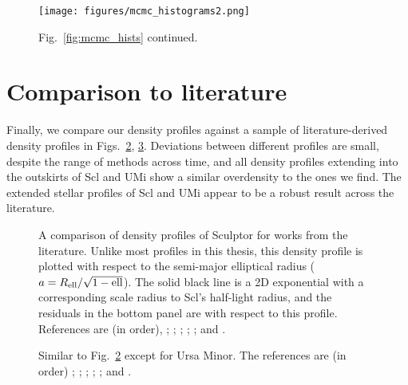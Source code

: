 \begin{figure}
\centering
\texttt{[image: figures/mcmc\_histograms2.png]}
\caption[Probabilistic density profiles
continued]{Fig.~\ref{fig:mcmc_hists} continued.}\label{fig:mcmc_hists2}
\end{figure}

\section{Comparison to literature}\label{comparison-to-literature}

Finally, we compare our density profiles against a sample of
literature-derived density profiles in
Figs.~\ref{fig:scl_lit_profiles}, \ref{fig:umi_lit_profiles}. Deviations
between different profiles are small, despite the range of methods
across time, and all density profiles extending into the outskirts of
Scl and UMi show a similar overdensity to the ones we find. The extended
stellar profiles of Scl and UMi appear to be a robust result across the
literature.

\begin{figure}
\centering
{}
\caption[Sculptor literature density profiles]{A comparison of density
profiles of Sculptor for works from the literature. Unlike most profiles
in this thesis, this density profile is plotted with respect to the
semi-major elliptical radius (\(a = R_{\rm ell} / \sqrt{1-{\rm ell}}\)).
The solid black line is a 2D exponential with a corresponding scale
radius to Scl's half-light radius, and the residuals in the bottom panel
are with respect to this profile. References are (in order),
\citet{munoz+2018}; \citet{westfall+2006}; \citet{walcher+2003};
\citet{eskridge1988}; \citet{demers+krautter+kunkel1980}; and
\citet{hodge1961}.}\label{fig:scl_lit_profiles}
\end{figure}

\begin{figure}
\centering
{}
\caption[Ursa Minor literature density profiles]{Similar to
Fig.~\ref{fig:scl_lit_profiles} except for Ursa Minor. The references
are (in order) \citet[derived using their minor axis
profile]{sato+2025}; \citet{palma+2003}; \citet{martinez-delgado+2001};
\citet{kleyna+1998}; \citet{IH1995}; and
\citet{Hodge1964}.}\label{fig:umi_lit_profiles}
\end{figure}

